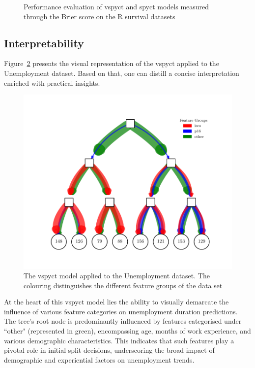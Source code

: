 \documentclass[3p,review,authoryear]{elsarticle}
\begin{document}
\begin{figure}[h!]
\caption{Performance evaluation of \gls{vspyct} and \gls{spyct} models measured through the Brier score on the R survival datasets}
\label{fig:brier_scores}
\end{figure}


\subsection{Interpretability}


Figure~\ref{fig:inter_tree} presents the visual representation of the \gls{vspyct} applied to the Unemployment dataset.
Based on that, one can distill a concise interpretation enriched with practical insights.

\begin{figure}[h!]
    \centering
    \includegraphics{hecat_tree_old_temp.pdf}
    \caption{The \gls{vspyct} model applied to the Unemployment dataset. The colouring distinguishes the different feature groups of the data set}
    \label{fig:inter_tree}
\end{figure}

At the heart of this \gls{vspyct} model lies the ability to visually demarcate the influence of various feature categories on unemployment duration predictions.
The tree's root node is predominantly influenced by features categorised under ``other" (represented in green), encompassing age, months of work experience, and various demographic characteristics.
This indicates that such features play a pivotal role in initial split decisions, underscoring the broad impact of demographic and experiential factors on unemployment trends.
\end{document}
